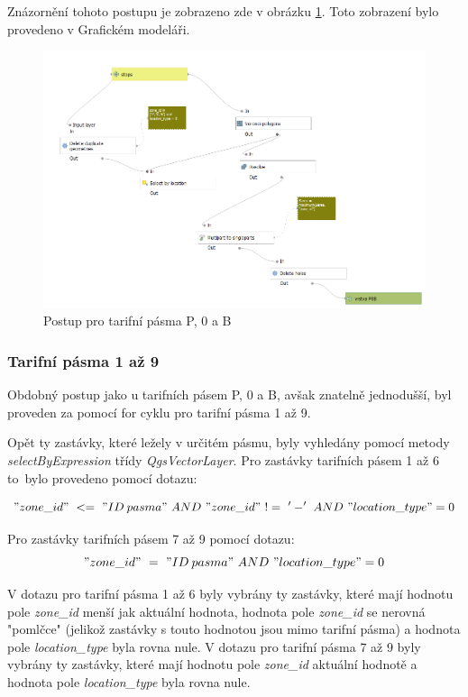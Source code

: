 Znázornění tohoto postupu je zobrazeno zde v obrázku \ref{fig:postup-voronoi-P0B}. Toto zobrazení bylo provedeno v Grafickém modeláři.

\begin{figure}[H] \centering
    \includegraphics[width=400pt]{./pictures/postup-voronoi-P0B.png}
    \caption[Postup pro tarifní pásma P, 0 a B]{Postup pro tarifní pásma P, 0 a B}
	\label{fig:postup-voronoi-P0B}              
\end{figure}

\subsubsection{Tarifní pásma 1 až 9}
\label{tp_1az9}

Obdobný postup jako u tarifních pásem P, 0 a B, avšak znatelně jednodušší, byl proveden za pomocí
for cyklu pro tarifní pásma 1 až 9. 

Opět ty zastávky, které ležely v určitém pásmu, byly vyhledány pomocí metody \textit{selectByExpression} třídy 
\textit{QgsVectorLayer}. Pro zastávky tarifních pásem 1 až 6 to~bylo provedeno pomocí dotazu:

\["zone\_id"\ <=\ "ID\: pasma"\ AND\ "zone\_id"\ !=\ '-'\ AND\ "location\_type" = 0\]  

Pro zastávky tarifních pásem 7 až 9 pomocí dotazu:
\["zone\_id"\ =\ "ID\: pasma"\ AND\ "location\_type" = 0\] 

V dotazu pro tarifní pásma 1 až 6 byly vybrány ty zastávky, které mají hodnotu pole \textit{zone\_id} menší jak aktuální hodnota,
hodnota pole \textit{zone\_id} se nerovná "pomlčce" (jelikož zastávky s touto hodnotou jsou mimo tarifní pásma)
a hodnota pole \textit{location\_type} byla rovna nule. V dotazu pro tarifní pásma 7 až 9 byly vybrány ty zastávky,
které mají hodnotu pole \textit{zone\_id} aktuální hodnotě a hodnota pole \textit{location\_type} byla rovna nule.

